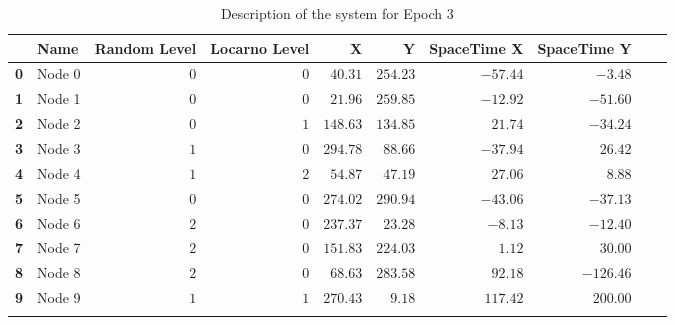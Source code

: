 \documentclass[a4paper,11pt,twoside,openright]{report}
\begin{document}
\begin{table}[h]
\centering
\tiny
\begin{tabular}{@{}llrrrrrrll@{}}
\toprule
& \textbf{Name}   &\textbf{Random Level} &\textbf{Locarno Level} & \textbf{X} & \textbf{Y} & \textbf{SpaceTime X} & \textbf{SpaceTime Y}  \\ \midrule
\textbf{0} & Node 0&$0$&$0$&$40.31$&$254.23$&$-57.44$&$-3.48$&\\ \hdashline
\textbf{1} & Node 1&$0$&$0$&$21.96$&$259.85$&$-12.92$&$-51.60$&\\ \hdashline
\textbf{2} & Node 2&$0$&$1$&$148.63$&$134.85$&$21.74$&$-34.24$&\\ \hdashline
\textbf{3} & Node 3&$1$&$0$&$294.78$&$88.66$&$-37.94$&$26.42$&\\ \hdashline
\textbf{4} & Node 4&$1$&$2$&$54.87$&$47.19$&$27.06$&$8.88$&\\ \hdashline
\textbf{5} & Node 5&$0$&$0$&$274.02$&$290.94$&$-43.06$&$-37.13$&\\ \hdashline
\textbf{6} & Node 6&$2$&$0$&$237.37$&$23.28$&$-8.13$&$-12.40$&\\ \hdashline
\textbf{7} & Node 7&$2$&$0$&$151.83$&$224.03$&$1.12$&$30.00$&\\ \hdashline
\textbf{8} & Node 8&$2$&$0$&$68.63$&$283.58$&$92.18$&$-126.46$&\\ \hdashline
\textbf{9} & Node 9&$1$&$1$&$270.43$&$9.18$&$117.42$&$200.00$&\\ \hdashline\midrule
\bottomrule
\end{tabular}
\caption{Description of the system for Epoch 3}
\end{table}
\end{document}
